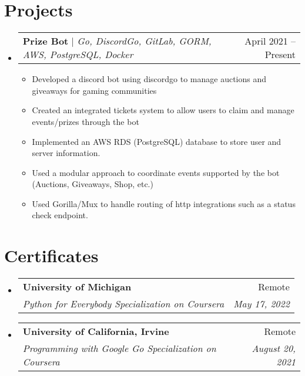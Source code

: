 \documentclass[letterpaper,11pt]{article}
\makeatletter
\newcommand{\resumeItem}[1]{
  \item\small{
    {#1 \vspace{-2pt}}
  }
}
\newcommand{\resumeSubheading}[4]{
  \vspace{-2pt}\item
    \begin{tabular*}{0.97\textwidth}[t]{l@{\extracolsep{\fill}}r}
      \textbf{#1} & #2 \\
      \textit{\small#3} & \textit{\small #4} \\
    \end{tabular*}\vspace{-7pt}
}
\newcommand{\resumeProjectHeading}[2]{
    \item
    \begin{tabular*}{0.97\textwidth}{l@{\extracolsep{\fill}}r}
      \small#1 & #2 \\
    \end{tabular*}\vspace{-7pt}
}
\newcommand{\resumeSubHeadingListStart}{\begin{itemize}[leftmargin=0.15in, label={}]}
\newcommand{\resumeSubHeadingListEnd}{\end{itemize}}
\newcommand{\resumeItemListStart}{\begin{itemize}}
\newcommand{\resumeItemListEnd}{\end{itemize}\vspace{-5pt}}
\makeatother
\begin{document}
\section{Projects}
    \resumeSubHeadingListStart
      \resumeProjectHeading
          {\textbf{Prize Bot} $|$ \emph{Go, DiscordGo, GitLab, GORM, AWS, PostgreSQL, Docker}}{April 2021 -- Present}
          \resumeItemListStart
            \resumeItem{Developed a discord bot using discordgo to manage auctions and giveaways for gaming communities}
            \resumeItem{Created an integrated tickets system to allow users to claim and manage events/prizes through the bot}
            \resumeItem{Implemented an AWS RDS (PostgreSQL) database to store user and server information. }
            \resumeItem{Used a modular approach to coordinate events supported by the bot (Auctions, Giveaways, Shop, etc.)}
            \resumeItem{Used Gorilla/Mux to handle routing of http integrations such as a status check endpoint.}
          \resumeItemListEnd
      
    \resumeSubHeadingListEnd

\section{Certificates}
  \resumeSubHeadingListStart
    \resumeSubheading
      {University of Michigan}{Remote}
      {Python for Everybody Specialization on Coursera}{May 17, 2022}
    \resumeSubheading
      {University of California, Irvine}{Remote}
      {Programming with Google Go Specialization on Coursera}{August 20, 2021}
  \resumeSubHeadingListEnd


%
\end{document}
